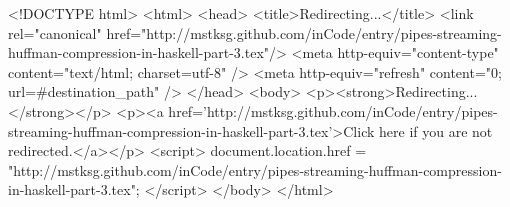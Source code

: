 <!DOCTYPE html>
<html>
<head>
<title>Redirecting...</title>
<link rel="canonical" href="http://mstksg.github.com/inCode/entry/pipes-streaming-huffman-compression-in-haskell-part-3.tex"/>
<meta http-equiv="content-type" content="text/html; charset=utf-8" />
<meta http-equiv="refresh" content="0; url=#{destination_path}" />
</head>
<body>
  <p><strong>Redirecting...</strong></p>
  <p><a href='http://mstksg.github.com/inCode/entry/pipes-streaming-huffman-compression-in-haskell-part-3.tex'>Click here if you are not redirected.</a></p>
  <script>
    document.location.href = "http://mstksg.github.com/inCode/entry/pipes-streaming-huffman-compression-in-haskell-part-3.tex";
  </script>
</body>
</html>

